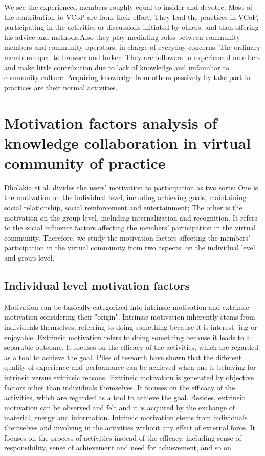 \documentclass{elsarticle}
\begin{document}
We see the  experienced members roughly equal to insider and
devotee. Most of the contribution to VCoP are from their effort. They
lead the practices in VCoP, participating in the activities or
discussions initiated by others, and then offering his advice and
methods.Also they play mediating roles between community members and community operators, in charge of everyday concerns.
 The ordinary members equal to browser and lurker. They are followers
 to experienced members and make little contribution due to lack of
 knowledge and unfamiliar to community culture. Acquiring knowledge
 from others passively by take part in practices are their normal activities.



\section{Motivation factors analysis of knowledge collaboration in virtual community of practice}
\label{sec:motiv-fact-analys}


 Dholakia et al. \cite{Dholakia2004241}divides the users’ motivation to participation as two sorts: One is the motivation on the individual level, including achieving goals, maintaining social relationship, social reinforcement and entertainment; The other is the motivation on the group level, including internalization and recognition. It refers to the social influence factors affecting the members’ participation in the virtual community. Therefore, we study the motivation factors affecting the members’ participation in the virtual community from two aspects: on the individual level and group level.  

\subsection{Individual level motivation factors}
\label{sec:individual-level}

Motivation can be basically categorized into intrinsic motivation and
extrinsic motivation considering their "origin". Intrinsic motivation
inherently  stems from individuals themselves, referring to doing something because it is interest-
ing or enjoyable. Extrinsic motivation refers to doing something
because it leads to a separable outcome.  It focuses on the efficacy
of the activities, which are regarded as a tool to achieve the goal. Piles of research have
shown that the different quality of experience and performance can be achieved
when one is behaving for intrinsic versus extrinsic
reasons\cite{Ryan200054}.  Extrinsic motivation is generated by
objective factors other than individuals themselves. It focuses on the
efficacy of the activities, which are regarded as a tool to achieve
the goal. Besides, extrinsic motivation can be observed and felt and
it is acquired by the exchange of material, energy and
information. Intrinsic motivation stems from individuals themselves
and involving in the activities without any effect of external
force. It focuses on the process of activities instead of the
efficacy, including sense of responsibility, sense of achievement and
need for achievement, and so on. 
\end{document}
